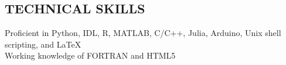 \documentclass[11pt]{res} %
\newcommand{\titlegap}{5pt} %
\newcommand{\centitlegap}{-2pt}
\newcommand{\censectgap}{-.05in}
\begin{document}
\begin{resume}
\section{TECHNICAL SKILLS}

\vspace{\centitlegap} 

\begin{center}
Proficient in Python, IDL, R, MATLAB, C/C++, Julia, Arduino, Unix shell scripting, and \LaTeX \\
Working knowledge of FORTRAN and HTML5
\end{center}

\vspace{\censectgap} %







\end{resume} 
\end{document}
